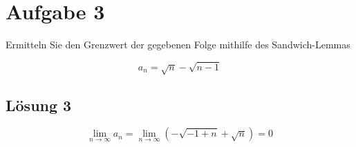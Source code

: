 \section*{Aufgabe 3}

Ermitteln Sie den Grenzwert der gegebenen Folge mithilfe des Sandwich-Lemmas


\begin{equation*}
  a_{n} =\sqrt{n} -\sqrt{n-1}
\end{equation*}

\subsection*{Lösung 3}

\begin{equation*}
  \lim\limits _{n\rightarrow \infty } a_{n} =\lim\limits _{n\rightarrow \infty }\left( -\sqrt{-1+n} +\sqrt{n}\right) =0
\end{equation*}